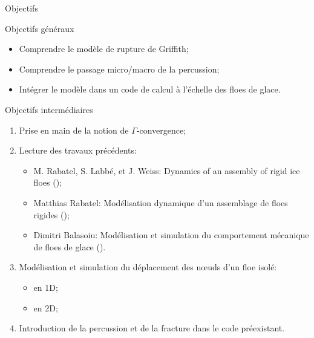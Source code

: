 \begin{frame}{Objectifs}

  \begin{exampleblock}{Objectifs généraux}

    \begin{itemize}
      \item Comprendre le modèle de rupture de Griffith; \pause
      \item Comprendre le passage micro/macro de la percussion; \pause 
      \item Intégrer le modèle dans un code de calcul à l’échelle des floes de glace.
    \end{itemize}
  \end{exampleblock}

  \pause

  \begin{block}{Objectifs intermédiaires}

    \begin{enumerate}
      \item Prise en main de la notion de $\Gamma$‑convergence;
      \item Lecture des travaux précédents:
      \begin{itemize}
        \item \alert{M. Rabatel, S. Labbé, et J. Weiss}: Dynamics of an assembly of rigid ice floes (\citeyear{rabatel2015dynamics}); 
        \item \alert{Matthias Rabatel}: Modélisation dynamique d’un assemblage de floes rigides (\citeyear{rabatel2015modelisation});
        \item \alert{Dimitri Balasoiu}: Modélisation et simulation du comportement mécanique de floes de glace (\citeyear{balasoiu2020modelisation}).
      \end{itemize}
      
      \item Modélisation et simulation du déplacement des n\oe{}uds d'un floe isolé:
      \begin{itemize}
        \item en 1D;
        \item en 2D;
      \end{itemize}

      \item Introduction de la percussion et de la fracture dans le code préexistant.

    \end{enumerate}
  \end{block}

\end{frame}

